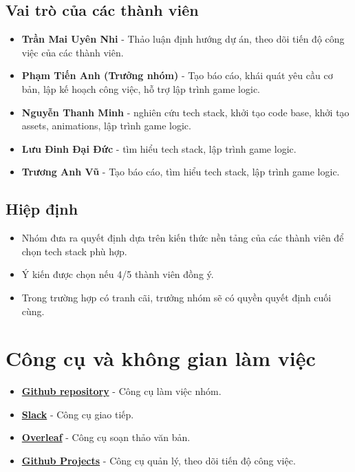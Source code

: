 \documentclass[a4paper, 12pt]{article}
\begin{document}
\subsection{Vai trò của các thành viên}
\begin{itemize}
    \item \textbf{Trần Mai Uyên Nhi} - Thảo luận định hướng dự án, theo dõi tiến độ công việc của các thành viên.
    \item \textbf{Phạm Tiến Anh (Trưởng nhóm)} - Tạo báo cáo, khái quát yêu cầu cơ bản, lập kế hoạch công việc, hỗ trợ lập trình game logic.
    \item \textbf{Nguyễn Thanh Minh} - nghiên cứu tech stack, khởi tạo code base, khởi tạo assets, animations, lập trình game logic.
    \item \textbf{Lưu Đinh Đại Đức} - tìm hiểu tech stack, lập trình game logic.
    \item \textbf{Trương Anh Vũ} - Tạo báo cáo, tìm hiểu tech stack, lập trình game logic.
\end{itemize}

\subsection{Hiệp định}
\begin{itemize}
    \item Nhóm đưa ra quyết định dựa trên kiến thức nền tảng của các thành viên để chọn tech stack phù hợp.
    \item Ý kiến được chọn nếu 4/5 thành viên đồng ý.
    \item Trong trường hợp có tranh cãi, trưởng nhóm sẽ có quyền quyết định cuối cùng.
\end{itemize}

\section{Công cụ và không gian làm việc}
\begin{itemize}
    \item \href{https://github.com/UIT-24730009/SnakeGame}{\large \textbf{Github repository}} - Công cụ làm việc nhóm.
    \item \href{https://app.slack.com/client/T07Q56DLLUX/C07U74U2XGF}{\large \textbf{Slack}} - Công cụ giao tiếp.
    \item \href{https://www.overleaf.com/project/67271c85e33c6e0dfe041c9d}{\large \textbf{Overleaf}} - Công cụ soạn thảo văn bản.
    \item \href{https://github.com/users/UIT-24730009/projects/1/views/1}{\large \textbf{Github Projects}} - Công cụ quản lý, theo dõi tiến độ công việc.
\end{itemize}
\end{document}
